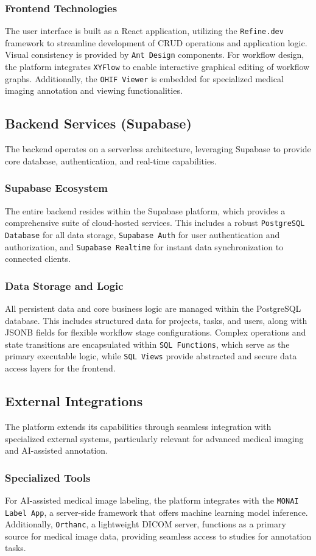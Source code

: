 \subsubsection{Frontend Technologies}
The user interface is built as a React application, utilizing the \texttt{Refine.dev} framework to streamline development of CRUD operations and application logic. Visual consistency is provided by \texttt{Ant Design} components. For workflow design, the platform integrates \texttt{XYFlow} to enable interactive graphical editing of workflow graphs. Additionally, the \texttt{OHIF Viewer} is embedded for specialized medical imaging annotation and viewing functionalities.

\subsection{Backend Services (Supabase)}
The backend operates on a serverless architecture, leveraging Supabase to provide core database, authentication, and real-time capabilities.

\subsubsection{Supabase Ecosystem}
The entire backend resides within the Supabase platform, which provides a comprehensive suite of cloud-hosted services. This includes a robust \texttt{PostgreSQL Database} for all data storage, \texttt{Supabase Auth} for user authentication and authorization, and \texttt{Supabase Realtime} for instant data synchronization to connected clients.

\subsubsection{Data Storage and Logic}
All persistent data and core business logic are managed within the PostgreSQL database. This includes structured data for projects, tasks, and users, along with JSONB fields for flexible workflow stage configurations. Complex operations and state transitions are encapsulated within \texttt{SQL Functions}, which serve as the primary executable logic, while \texttt{SQL Views} provide abstracted and secure data access layers for the frontend.

\subsection{External Integrations}
The platform extends its capabilities through seamless integration with specialized external systems, particularly relevant for advanced medical imaging and AI-assisted annotation.

\subsubsection{Specialized Tools}
For AI-assisted medical image labeling, the platform integrates with the \texttt{MONAI Label App}, a server-side framework that offers machine learning model inference. Additionally, \texttt{Orthanc}, a lightweight DICOM server, functions as a primary source for medical image data, providing seamless access to studies for annotation tasks.